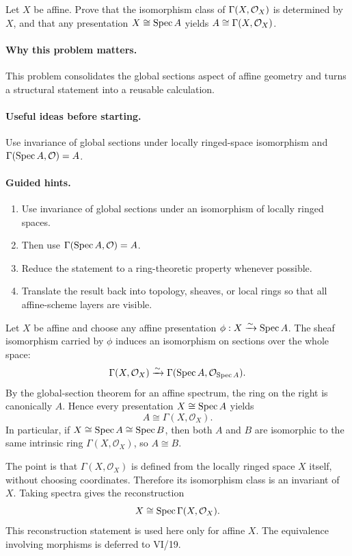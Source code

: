 \begin{problem}\label{prob:vi18-p03}
Let $X$ be affine. Prove that the isomorphism class of $\Gamma(X,\mathcal O_X)$ is determined by $X$, and that any presentation $X\cong\operatorname{Spec} A$ yields $A\cong\Gamma(X,\mathcal O_X)$.
\end{problem}

\ifdefined\FullProblemDossiers
\paragraph{Why this problem matters.}
This problem consolidates the global sections aspect of affine geometry and turns a structural statement into a reusable calculation.

\paragraph{Useful ideas before starting.}
Use invariance of global sections under locally ringed-space isomorphism and $\Gamma(\operatorname{Spec} A,\mathcal O)=A$.

\paragraph{Guided hints.}
\begin{enumerate}
\item Use invariance of global sections under an isomorphism of locally ringed spaces.
\item Then use $\Gamma(\operatorname{Spec} A,\mathcal O)=A$.
\item Reduce the statement to a ring-theoretic property whenever possible.
\item Translate the result back into topology, sheaves, or local rings so that all affine-scheme layers are visible.
\end{enumerate}

\begin{solution}
Let $X$ be affine and choose any affine presentation $\phi:X\xrightarrow{\sim}\operatorname{Spec} A$.  The sheaf isomorphism carried by $\phi$ induces an isomorphism on sections over the whole space:
\[
\Gamma(X,\mathcal O_X)\xrightarrow{\sim}\Gamma(\operatorname{Spec} A,\mathcal O_{\operatorname{Spec} A}).
\]
By the global-section theorem for an affine spectrum, the ring on the right is canonically $A$. Hence every presentation $X\cong\operatorname{Spec} A$ yields
\[
A\cong\Gamma(X,\mathcal O_X).
\]
In particular, if $X\cong\operatorname{Spec} A\cong\operatorname{Spec} B$, then both $A$ and $B$ are isomorphic to the same intrinsic ring $\Gamma(X,\mathcal O_X)$, so $A\cong B$.

The point is that $\Gamma(X,\mathcal O_X)$ is defined from the locally ringed space $X$ itself, without choosing coordinates. Therefore its isomorphism class is an invariant of $X$. Taking spectra gives the reconstruction
\[
X\cong\operatorname{Spec}\Gamma(X,\mathcal O_X).
\]
This reconstruction statement is used here only for affine $X$.  The equivalence involving morphisms is deferred to VI/19.
\end{solution}


